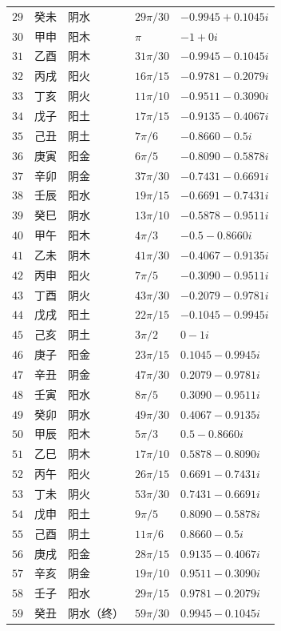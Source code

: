 \begin{longtable}{>{\centering\arraybackslash}p{1cm}>{\centering\arraybackslash}p{1.5cm}>{\centering\arraybackslash}p{1.5cm}>{\centering\arraybackslash}p{2cm}>{\centering\arraybackslash}p{3.5cm}}
$29$ & 癸未 & 阴水 & $29\pi/30$ & $-0.9945+0.1045i$ \\
$30$ & 甲申 & 阳木 & $\pi$ & $-1+0i$ \\
$31$ & 乙酉 & 阴木 & $31\pi/30$ & $-0.9945-0.1045i$ \\
$32$ & 丙戌 & 阳火 & $16\pi/15$ & $-0.9781-0.2079i$ \\
$33$ & 丁亥 & 阴火 & $11\pi/10$ & $-0.9511-0.3090i$ \\
$34$ & 戊子 & 阳土 & $17\pi/15$ & $-0.9135-0.4067i$ \\
$35$ & 己丑 & 阴土 & $7\pi/6$ & $-0.8660-0.5i$ \\
$36$ & 庚寅 & 阳金 & $6\pi/5$ & $-0.8090-0.5878i$ \\
$37$ & 辛卯 & 阴金 & $37\pi/30$ & $-0.7431-0.6691i$ \\
$38$ & 壬辰 & 阳水 & $19\pi/15$ & $-0.6691-0.7431i$ \\
$39$ & 癸巳 & 阴水 & $13\pi/10$ & $-0.5878-0.9511i$ \\
$40$ & 甲午 & 阳木 & $4\pi/3$ & $-0.5-0.8660i$ \\
$41$ & 乙未 & 阴木 & $41\pi/30$ & $-0.4067-0.9135i$ \\
$42$ & 丙申 & 阳火 & $7\pi/5$ & $-0.3090-0.9511i$ \\
$43$ & 丁酉 & 阴火 & $43\pi/30$ & $-0.2079-0.9781i$ \\
$44$ & 戊戌 & 阳土 & $22\pi/15$ & $-0.1045-0.9945i$ \\
$45$ & 己亥 & 阴土 & $3\pi/2$ & $0-1i$ \\
$46$ & 庚子 & 阳金 & $23\pi/15$ & $0.1045-0.9945i$ \\
$47$ & 辛丑 & 阴金 & $47\pi/30$ & $0.2079-0.9781i$ \\
$48$ & 壬寅 & 阳水 & $8\pi/5$ & $0.3090-0.9511i$ \\
$49$ & 癸卯 & 阴水 & $49\pi/30$ & $0.4067-0.9135i$ \\
$50$ & 甲辰 & 阳木 & $5\pi/3$ & $0.5-0.8660i$ \\
$51$ & 乙巳 & 阴木 & $17\pi/10$ & $0.5878-0.8090i$ \\
$52$ & 丙午 & 阳火 & $26\pi/15$ & $0.6691-0.7431i$ \\
$53$ & 丁未 & 阴火 & $53\pi/30$ & $0.7431-0.6691i$ \\
$54$ & 戊申 & 阳土 & $9\pi/5$ & $0.8090-0.5878i$ \\
$55$ & 己酉 & 阴土 & $11\pi/6$ & $0.8660-0.5i$ \\
$56$ & 庚戌 & 阳金 & $28\pi/15$ & $0.9135-0.4067i$ \\
$57$ & 辛亥 & 阴金 & $19\pi/10$ & $0.9511-0.3090i$ \\
$58$ & 壬子 & 阳水 & $29\pi/15$ & $0.9781-0.2079i$ \\
$59$ & 癸丑 & 阴水（终） & $59\pi/30$ & $0.9945-0.1045i$ \\
\end{longtable}
\endgroup

